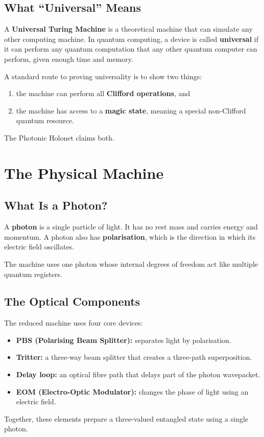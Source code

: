 \documentclass[11pt]{article}
\begin{document}
\subsection{What ``Universal'' Means}
A \textbf{Universal Turing Machine} is a theoretical machine that can simulate any other computing machine. In quantum computing, a device is called \textbf{universal} if it can perform any quantum computation that any other quantum computer can perform, given enough time and memory.

A standard route to proving universality is to show two things:
\begin{enumerate}[leftmargin=1.5em]
    \item the machine can perform all \textbf{Clifford operations}, and
    \item the machine has access to a \textbf{magic state}, meaning a special non-Clifford quantum resource.
\end{enumerate}
The Photonic Holonet claims both.

\section{The Physical Machine}

\subsection{What Is a Photon?}
A \textbf{photon} is a single particle of light. It has no rest mass and carries energy and momentum. A photon also has \textbf{polarisation}, which is the direction in which its electric field oscillates.

The machine uses one photon whose internal degrees of freedom act like multiple quantum registers.

\subsection{The Optical Components}
The reduced machine uses four core devices:
\begin{itemize}[leftmargin=1.5em]
    \item \textbf{PBS (Polarising Beam Splitter):} separates light by polarisation.
    \item \textbf{Tritter:} a three-way beam splitter that creates a three-path superposition.
    \item \textbf{Delay loop:} an optical fibre path that delays part of the photon wavepacket.
    \item \textbf{EOM (Electro-Optic Modulator):} changes the phase of light using an electric field.
\end{itemize}
Together, these elements prepare a three-valued entangled state using a single photon.
\end{document}
